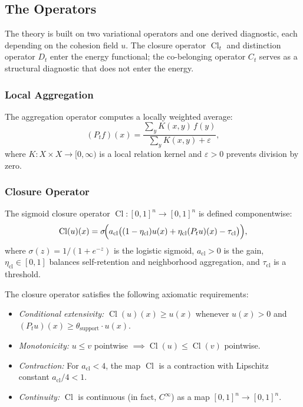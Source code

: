 \documentclass[lettersize,journal]{IEEEtran}
\DeclareMathOperator{\Cl}{Cl}
\begin{document}
\subsection{The Operators}
\label{sec:operators}

The theory is built on two variational operators and one derived diagnostic, each depending on the cohesion field $u$. The closure operator $\Cl_t$ and distinction operator $D_t$ enter the energy functional; the co-belonging operator $C_t$ serves as a structural diagnostic that does not enter the energy.

\subsubsection{Local Aggregation}

The aggregation operator computes a locally weighted average:
\begin{equation}
(P_t f)(x) = \frac{\sum_{y} K(x,y)\, f(y)}{\sum_{y} K(x,y) + \varepsilon},
\end{equation}
where $K : X \times X \to [0,\infty)$ is a local relation kernel and $\varepsilon > 0$ prevents division by zero.

\subsubsection{Closure Operator}

The sigmoid closure operator $\Cl : [0,1]^n \to [0,1]^n$ is defined componentwise:
\begin{equation}
\label{eq:closure}
\Cl(u)(x) = \sigma\!\Bigl(a_{\mathrm{cl}}\bigl((1-\eta_{\mathrm{cl}})u(x) + \eta_{\mathrm{cl}}(P_t u)(x) - \tau_{\mathrm{cl}}\bigr)\Bigr),
\end{equation}
where $\sigma(z) = 1/(1+e^{-z})$ is the logistic sigmoid, $a_{\mathrm{cl}} > 0$ is the gain, $\eta_{\mathrm{cl}} \in [0,1]$ balances self-retention and neighborhood aggregation, and $\tau_{\mathrm{cl}}$ is a threshold.

The closure operator satisfies the following axiomatic requirements:
\begin{itemize}
\item[\textbf{A1$'$}] \emph{Conditional extensivity:} $\Cl(u)(x) \geq u(x)$ whenever $u(x) > 0$ and $(P_t u)(x) \geq \theta_{\mathrm{support}} \cdot u(x)$.
\item[\textbf{A2}] \emph{Monotonicity:} $u \leq v$ pointwise $\implies \Cl(u) \leq \Cl(v)$ pointwise.
\item[\textbf{A3}] \emph{Contraction:} For $a_{\mathrm{cl}} < 4$, the map $\Cl$ is a contraction with Lipschitz constant $a_{\mathrm{cl}}/4 < 1$.
\item[\textbf{A4}] \emph{Continuity:} $\Cl$ is continuous (in fact, $C^\infty$) as a map $[0,1]^n \to [0,1]^n$.
\end{itemize}
\end{document}
